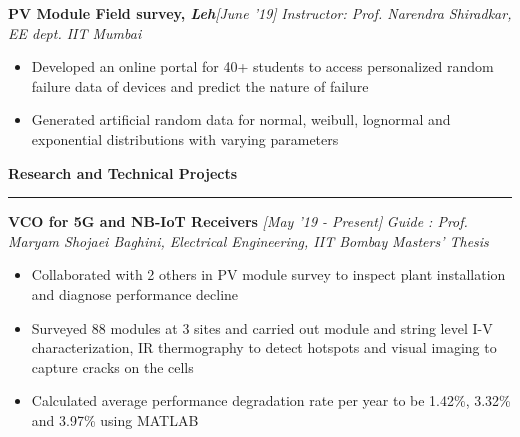 \documentclass[11pt]{article}%
\begin{document}
{\flushleft \bf {\large{PV Module Field survey}}, \em{Leh}}\hfill {{{\em{[June '19]}}}}
\vspace{-0.8em}
{\flushleft \em{Instructor: Prof. Narendra Shiradkar, EE dept. IIT Mumbai}}
\vspace{-5pt}
\begin{itemize}[leftmargin=*]
	\setlength\itemsep{1.5pt}
	\setlength\parskip{1.5pt}
	\item Developed an online portal for 40+ students to access personalized random failure data of devices and predict the nature of failure
	\item Generated artificial random data for normal, weibull, lognormal and exponential distributions with varying parameters
\end{itemize}

\begin{center}
\bf{\Large{Research and Technical Projects}}
\end{center}
\vspace{-2mm}
\hrule
\vspace{-1mm}


{\flushleft \bf \large{VCO for 5G and NB-IoT Receivers}} \hfill {{{\em{[May '19 - Present]}}}} 
\vspace{-2mm}
 {\flushleft \em{Guide : Prof. Maryam Shojaei Baghini, Electrical Engineering, IIT Bombay}} \hfill{\em{Masters' Thesis}}
\vspace{3mm}
\begin{itemize}[leftmargin=*]
	\setlength\itemsep{0.01em}
    \vspace{-5mm}	
    \item Collaborated with 2 others in PV module survey to inspect plant installation and diagnose performance decline
    \item Surveyed 88 modules at 3 sites and carried out module and string level I-V characterization, IR thermography to detect hotspots and visual imaging to capture cracks on the cells
    \item Calculated average performance degradation rate per year to be  1.42\%, 3.32\% and 3.97\% using MATLAB
\end{itemize}
\end{document}
